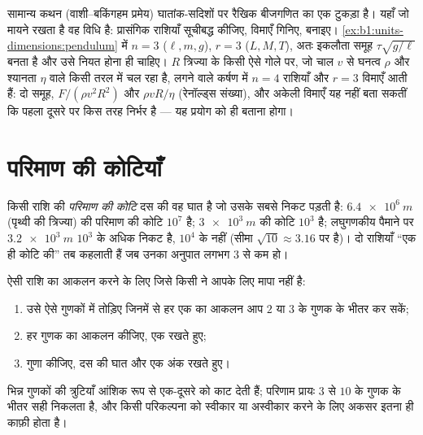 \begin{remark}[प्रतिज्ञप्ति का उपयोग]\label{rem:b1:units-dimensions:pi}
सामान्य कथन (वाशी--बकिंगहम प्रमेय) घातांक-सदिशों पर रैखिक बीजगणित का एक टुकड़ा
है। यहाँ जो मायने रखता है वह विधि है: प्रासंगिक राशियाँ सूचीबद्ध कीजिए, विमाएँ
गिनिए,  बनाइए। \cref{ex:b1:units-dimensions:pendulum} में $n = 3$
($\ell, m, g$), $r = 3$ ($L, M, T$), अतः इकलौता समूह
$\tau\sqrt{g/\ell}$ बनता है और उसे नियत होना ही चाहिए। $R$ त्रिज्या के किसी ऐसे
गोले पर, जो चाल $v$ से घनत्व $\rho$ और श्यानता $\eta$ वाले किसी तरल में चल रहा
है, लगने वाले कर्षण में $n = 4$ राशियाँ और $r = 3$ विमाएँ आती हैं: दो समूह,
$F/(\rho v^2 R^2)$ और $\rho v R/\eta$ (रेनॉल्ड्स संख्या), और अकेली विमाएँ यह
नहीं बता सकतीं कि पहला दूसरे पर किस तरह निर्भर है --- यह प्रयोग को ही बताना
होगा।
\end{remark}

\section{परिमाण की कोटियाँ}

\begin{definition}[परिमाण की कोटि]\label{def:b1:units-dimensions:oom}
किसी राशि की \emph{परिमाण की कोटि} दस की वह घात है जो उसके सबसे निकट पड़ती है:
$\qty{6.4e6}{m}$ (पृथ्वी की त्रिज्या) की परिमाण की कोटि $10^7$ है;
$\qty{3e3}{m}$ की कोटि $10^3$ है; लघुगणकीय पैमाने पर $\qty{3.2e3}{m}$ $10^3$ के
अधिक निकट है, $10^4$ के नहीं (सीमा $\sqrt{10} \approx 3.16$ पर है)। दो
राशियाँ ``एक ही कोटि की'' तब कहलाती हैं जब उनका अनुपात लगभग $3$ से कम हो।
\end{definition}

\begin{method}\label{met:b1:units-dimensions:estimate}
ऐसी राशि का आकलन करने के लिए जिसे किसी ने आपके लिए मापा नहीं है:
\begin{enumerate}
  \item उसे ऐसे गुणकों में तोड़िए जिनमें से हर एक का आकलन आप $2$ या $3$ के
        गुणक के भीतर कर सकें;
  \item हर गुणक का आकलन कीजिए, एक  रखते हुए;
  \item गुणा कीजिए, दस की घात और एक अंक रखते हुए।
\end{enumerate}
भिन्न गुणकों की त्रुटियाँ आंशिक रूप से एक-दूसरे को काट देती हैं; परिणाम प्रायः
$3$ से $10$ के गुणक के भीतर सही निकलता है, और किसी परिकल्पना को स्वीकार या
अस्वीकार करने के लिए अकसर इतना ही काफ़ी होता है।
\end{method}


